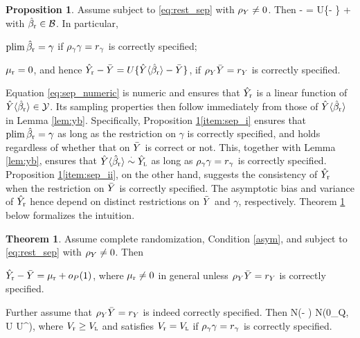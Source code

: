 \documentclass[11pt]{article}
\theoremstyle{definition}
\newtheorem{theorem}{Theorem}
\newtheorem{proposition}{Proposition}
\begin{document}
\begin{proposition}\label{prop:sep}
Assume \rlss subject to \eqref{eq:rest_sep}  with $\rho_Y \neq 0$. Then 
\beginy\label{eq:sep_numeric}
\hyr  - \by = U\{\hybr  - \by\} + \mur
\endy 
with $\hat\beta_{\textup{r}} \in \mathcal{B}$. In particular, 
\begine[(i)] 
\item\label{item:sep_i} $\textup{plim\,} \hat\beta_{\textup{r}} = \gamma$ 
 if $\rho_\gamma\gamma = r_\gamma$ is correctly specified;
 \item\label{item:sep_ii} $\mu_{{\textup{r}} } = 0$, and hence $
\hat Y_{\textup{r}}  - \bar Y = U\{\hat Y\langle \hat\beta_{\textup{r}}\rangle  - \bar Y\}$,
if 
$\rho_Y \bar Y = r_Y$ is correctly specified. 
\ende

\end{proposition}

Equation \eqref{eq:sep_numeric} is numeric and ensures that $\hat Y_{\textup{r}}$ is a linear function of $\hat Y\langle \hat\beta_{\textup{r}}\rangle  \in \mathcal{Y}$.  Its sampling properties then follow immediately from those of $\hat Y\langle \hat\beta_{\textup{r}}\rangle$ in Lemma \ref{lem:yb}. 
Specifically, Proposition \ref{prop:sep}\eqref{item:sep_i} ensures that $\textup{plim\,} \hat\beta_{\textup{r}}=\gamma$ as long as the restriction on $\gamma$ is correctly specified, and holds regardless of whether that on $\bar Y$ is correct or not.
This, together with Lemma \ref{lem:yb}, ensures that $\hat Y\langle \hat\beta_{\textup{r}}\rangle \overset{\cdot}{\sim} \hat Y_{\textsc{l}}$ as long as $\rho_\gamma\gamma = r_\gamma$ is correctly specified.
Proposition \ref{prop:sep}\eqref{item:sep_ii}, on the other hand, suggests the consistency of $\hat Y_{\textup{r}}$ when the restriction on $\bar Y$ is correctly specified.
The asymptotic bias and variance of $\hat Y_{\textup{r}}$ hence depend on distinct restrictions on $\bar Y$ and $\gamma$, respectively. Theorem \ref{thm:sep} below formalizes the intuition.  %

\begin{theorem}\label{thm:sep}
Assume complete randomization, Condition \ref{asym}, and  \rlss subject to \eqref{eq:rest_sep} with $\rho_Y \neq 0$. 
Then 
\begine[(i)]
\item\label{item:sep_numeric} $\hat Y_{\textup{r}}  - \bar Y = \mu_{{\textup{r}} } + o_P(1)$, where $\mu_{{\textup{r}} } \neq 0$ in general  unless $\rho_Y\bar Y= r_Y$ is correctly specified. 
\item\label{item:sep_eff}
Further assume that $\rho_Y\bar Y=r_Y$ is indeed correctly specified. Then 
\begina
\sqrt N(\hyr  - \by) \rs \mathcal N(0_Q, U \vlr  U^\T),
\enda
where $V_{\textup{r}} \geq V_{\textsc{l}}$ and satisfies $V_{\textup{r}} = V_{\textsc{l}}$ if $\rho_\gamma\gamma = r_\gamma$ is correctly specified.
\ende
\end{theorem}
\end{document}

